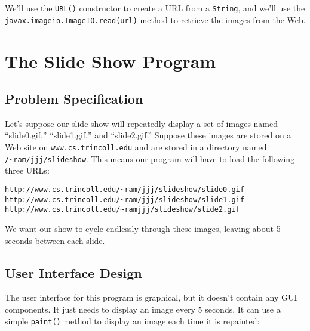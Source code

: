    We'll use the {\tt URL()}
constructor to create a URL from a {\tt String}, and we'll use
the {\tt javax.imageio.ImageIO.read(url)} method to retrieve the images
from the Web.


\section{The Slide Show Program}
\subsection*{Problem Specification}
\noindent Let's suppose our slide show will repeatedly display a set of images
named ``slide0.gif,'' ``slide1.gif,'' and ``slide2.gif.'' Suppose these
images are stored on a Web site on {\tt www.cs.trincoll.edu} and are
stored in a directory named {\tt /\verb!~!ram/jjj/slideshow}. This means
our program will have to load the following three URLs:

\begin{jjjlisting}[28pc]
\begin{lstlisting}[commentstyle=\color{black}]
http://www.cs.trincoll.edu/~ram/jjj/slideshow/slide0.gif
http://www.cs.trincoll.edu/~ram/jjj/slideshow/slide1.gif
http://www.cs.trincoll.edu/~ramjjj/slideshow/slide2.gif
\end{lstlisting}
\end{jjjlisting}

\noindent We want our show to cycle endlessly through these
images, leaving about 5 seconds between each slide.

\subsection*{User Interface Design}
\noindent The user interface for this program is graphical, but it
doesn't contain any GUI components.  It just needs to display an image
every 5 seconds.   It can use a simple {\tt paint()} method to display
an image each time it is repainted:

